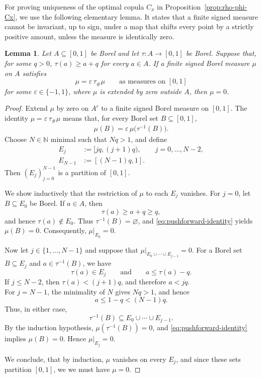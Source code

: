 \documentclass{article}
\newtheorem{lemma}[theorem]{Lemma}
\newcommand{\N}{\mathbb{N}}
\begin{document}
For proving uniqueness of the optimal copula \(C_x\) in Proposition~\ref{prop:rho-phi-Cx}, we use the following elementary lemma.
It states that a finite signed measure cannot be invariant, up to sign, under a map that shifts every point by a strictly positive amount, unless the measure is identically zero.

\begin{lemma}
\label{lem:no-upward-circulation}
Let \(A\subseteq[0,1]\) be Borel and let \(\tau:A\to[0,1]\) be Borel.
Suppose that, for some \(q>0\), \(\tau(a)\geq a+q\) for every \(a\in A\).
If a finite signed Borel measure \(\mu\) on \(A\) satisfies
\[
    \mu=\varepsilon\,\tau_\#\mu
    \qquad\text{as measures on }[0,1]
\]
for some \(\varepsilon\in\{-1,1\}\), where \(\mu\) is extended by zero outside \(A\), then \(\mu=0\).
\end{lemma}

\begin{proof}
Extend \(\mu\) by zero on \(A^c\) to a finite signed Borel measure on \([0,1]\).
The identity
\(
    \mu=\varepsilon\,\tau_\#\mu
\)
means that, for every Borel set \(B\subseteq[0,1]\),
\begin{align}\label{eq:pushforward-identity}
    \mu(B)
    =
    \varepsilon\,\mu\bigl(\tau^{-1}(B)\bigr).
\end{align}
Choose \(N\in\N\) minimal such that \(Nq>1\), and define
\begin{align*}
    E_j
    &:=
    [jq,(j+1)q),
    \qquad j=0,\ldots,N-2,\\
    E_{N-1}
    &:=
    [(N-1)q,1].
\end{align*}
Then \((E_j)_{j=0}^{N-1}\) is a partition of \([0,1]\).

We show inductively that the restriction of \(\mu\) to each \(E_j\) vanishes.
For \(j=0\), let \(B\subseteq E_0\) be Borel.
If \(a\in A\), then
\[
    \tau(a)\geq a+q\geq q,
\]
and hence \(\tau(a)\notin E_0\).
Thus \(\tau^{-1}(B)=\varnothing\), and \eqref{eq:pushforward-identity} yields \(\mu(B)=0\).
Consequently, \(\mu|_{E_0}=0\).

Now let \(j\in\{1,\ldots,N-1\}\) and suppose that \(\mu\big|_{E_0\cup\cdots\cup E_{j-1}}=0\).
For a Borel set \(B\subseteq E_j\) and \(a\in\tau^{-1}(B)\), we have
\[
    \tau(a)\in E_j
    \qquad\text{and}\qquad
    a\leq\tau(a)-q.
\]
If \(j\leq N-2\), then \(\tau(a)<(j+1)q\), and therefore \(a<jq\).\\
For \(j=N-1\), the minimality of \(N\) gives \(Nq>1\), and hence
\[
    a\leq 1-q<(N-1)q.
\]
Thus, in either case,
\[
    \tau^{-1}(B)
    \subseteq
    E_0\cup\cdots\cup E_{j-1}.
\]
By the induction hypothesis,
\(
    \mu(\tau^{-1}(B))=0
\),
and \eqref{eq:pushforward-identity} implies
\(
    \mu(B)=0
\).
Hence \(\mu|_{E_j}=0\).

We conclude, that by induction, \(\mu\) vanishes on every \(E_j\), and since these sets
partition \([0,1]\), we we must have \(\mu=0\).
\end{proof}
\end{document}
